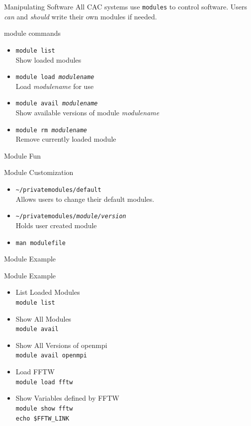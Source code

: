 \documentclass{beamer}
\begin{document}
\begin{frame}{Manipulating Software}
  All CAC systems use \texttt{modules} to control software. Users \textit{can} and \textit{should} write their own modules if needed.
  \begin{block}{module commands}
  \begin{itemize}
    \item \texttt{module list} \\ Show loaded modules
    \item \texttt{module load \textit{modulename}} \\  Load \textit{modulename} for use
    \item \texttt{module avail \textit{modulename}} \\ Show available versions of module \textit{modulename}
    \item \texttt{module rm \textit{modulename}} \\  Remove currently loaded module
  \end{itemize}
  \end{block}
\end{frame}
\begin{frame}{Module Fun}
  \begin{block}{Module Customization}
  \begin{itemize}
  \item \texttt{\~{}/privatemodules/default}
   \\    Allows users to change their default modules.
  \item \texttt{\~{}/privatemodules/\textit{module/version}}
   \\    Holds user created module
  \item \texttt{man modulefile}
  \end{itemize}
  \end{block}
\end{frame}
\begin{frame}{Module Example}
 \begin{block}{Module Example}
  \begin{itemize}
    \item<1-> List Loaded Modules
         \\ \texttt{module list}
    \item<2-> Show All Modules
         \\ \texttt{module avail}
    \item<3-> Show All Versions of openmpi
         \\ \texttt{module avail openmpi}
    \item<4-> Load FFTW
         \\ \texttt{module load fftw}
    \item<5-> Show Variables defined by FFTW 
         \\ \texttt{module show fftw}
         \\ \texttt{echo \$FFTW\_LINK}
  \end{itemize}
 \end{block}
\end{frame}
 
\end{document}
